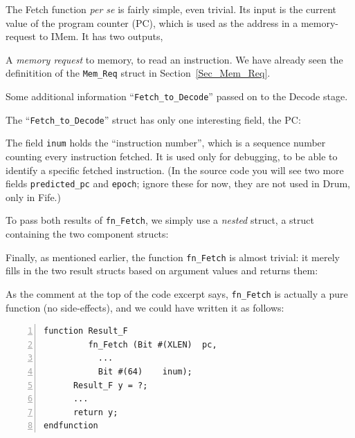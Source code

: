 \label{Sec_fn_Fetch}


The Fetch function \emph{per se} is fairly simple, even trivial.  Its
input is the current value of the program counter (PC), which is used
as the address in a memory-request to IMem.  It has two outputs,

\begin{tightlist}

 \item A \emph{memory request} to memory, to read an instruction.  We
       have already seen the definitition of the \verb|Mem_Req| struct
       in Section~\ref{Sec_Mem_Req}.

 \item Some additional information ``\verb|Fetch_to_Decode|'' passed
       on to the Decode stage.

\end{tightlist}

The ``\verb|Fetch_to_Decode|'' struct has only one interesting field,
the PC:



The field \verb|inum| holds the ``instruction number'', which is a
sequence number counting every instruction fetched.  It is used only
for debugging, to be able to identify a specific fetched instruction.
(In the source code you will see two more fields \verb|predicted_pc|
and \verb|epoch|; ignore these for now, they are not used in Drum,
only in Fife.)


To pass both results of \verb|fn_Fetch|, we simply use a \emph{nested}
struct, {\ie} a struct containing the two component structs:



Finally, as mentioned earlier, the function \verb|fn_Fetch| is almost
trivial: it merely fills in the two result structs based on argument
values and returns them:



As the comment at the top of the code excerpt says, \verb|fn_Fetch| is
actually a pure function (no side-effects), and we could have written
it as follows:

{\small
\begin{Verbatim}[frame=single, numbers=left]
function Result_F
         fn_Fetch (Bit #(XLEN)  pc,
		   ...
		   Bit #(64)    inum);
      Result_F y = ?;
      ...
      return y;
endfunction
\end{Verbatim}
}

